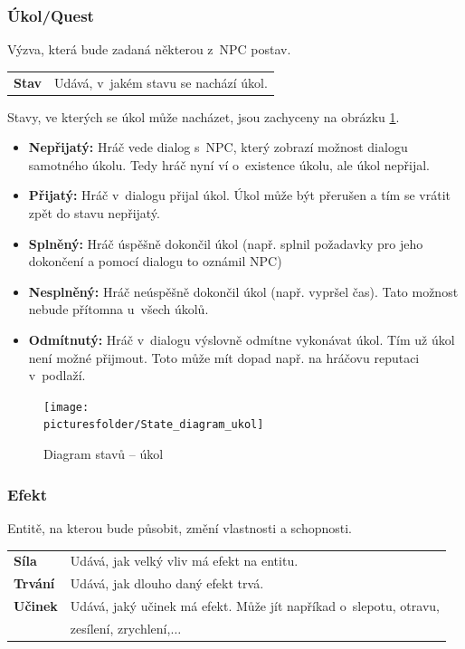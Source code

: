 \documentclass[12pt,a4paper]{article}
\def\picturesfolder{obrazky}
\begin{document}
\subsubsection{Úkol/Quest}
Výzva, která bude zadaná některou z~NPC postav.\\[5pt]

\begin{tabular*}{0.55\textwidth}{ll}
  \bf Stav & Udává, v~jakém stavu se nachází úkol.\\[7pt]
\end{tabular*}

\bigskip
\noindent
Stavy, ve kterých se úkol může nacházet, jsou zachyceny na obrázku
\ref{stavy:ukol}.

\begin {itemize}
\item{\textbf{Nepřijatý:} Hráč vede dialog s~NPC, který zobrazí možnost dialogu
  samotného úkolu. Tedy hráč nyní ví o~existence úkolu, ale úkol nepřijal.}
\item{\textbf{Přijatý:} Hráč v~dialogu přijal úkol. Úkol může být přerušen a tím
  se vrátit zpět do stavu nepřijatý.}
\item{\textbf{Splněný:} Hráč úspěšně dokončil úkol (např. splnil požadavky pro
  jeho dokončení a pomocí dialogu to oznámil NPC)}
\item{\textbf{Nesplněný:} Hráč neúspěšně dokončil úkol (např. vypršel čas). Tato
  možnost nebude přítomna u~všech úkolů.}
\item{\textbf{Odmítnutý:} Hráč v~dialogu výslovně odmítne vykonávat úkol. Tím už
  úkol není možné přijmout. Toto může mít dopad např. na hráčovu reputaci
v~podlaží.}
\end {itemize}

\begin{figure}
\begin{center}
  \texttt{[image: \\picturesfolder/State\_diagram\_ukol]}
  \caption{Diagram stavů -- úkol}
  \label{stavy:ukol}
\end{center}
\end{figure}

\subsubsection{Efekt}
Entitě, na kterou bude působit, změní vlastnosti a schopnosti. \\[5pt]

\begin{tabular*}{0.87\textwidth}{ll}
\bf Síla & Udává, jak velký vliv má efekt na entitu.\\[7pt]
\bf Trvání & Udává, jak dlouho daný efekt trvá.\\[7pt]
\bf Učinek & Udává, jaký učinek má efekt. Může jít napříkad o~slepotu, otravu,\\
           & zesílení, zrychlení,$\ldots$\\[7pt]
\end{tabular*}
\end{document}
